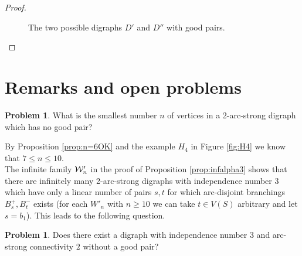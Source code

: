 \documentclass{article}
\theoremstyle{definition}
\newtheorem{problem}[theorem]{Problem}
\newcommand{\jbj}[1]{{#1}}
\newcommand{\2}{\vspace{0.2cm}}
\begin{document}
\begin{proof}
\begin{figure}[H]
\begin{center}
\caption{The two possible digraphs $D'$ and $D''$ with good
  pairs.}\label{fig:6ok}
\end{center}
\end{figure}
    \end{proof}

\section{Remarks and open problems}


\begin{problem}
What is the smallest number $n$ of vertices in a 2-arc-strong digraph which has no good pair?
\end{problem}

By Proposition \ref{prop:n=6OK} and the example $H_4$ in Figure \ref{fig:H4} we know that $7\leq n\leq 10$.\\

\jbj{The infinite family ${\cal W}'_n$ in the proof of Proposition \ref{prop:infalpha3} shows that there are infinitely many 2-arc-strong digraphs with independence number 3 which have only  a linear number of pairs $s,t$ for which arc-disjoint branchings $B_s^+,B_t^-$ exists (for each $W'_n$ with $n\geq 10$ we can take $t\in V(S)$  arbitrary and let $s=b_1$). This leads to the following question.}

\jbj{\begin{problem}
Does  there exist a digraph with independence number $3$ and arc-strong connectivity $2$ without a good pair?
\end{problem}}
    
\end{document}
